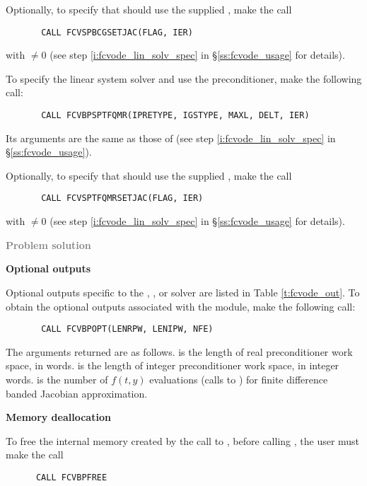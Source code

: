 \begin{Steps}
  Optionally, to specify that {\spbcg} should use the supplied , 
  make the call
\begin{verbatim}
       CALL FCVSPBCGSETJAC(FLAG, IER)
\end{verbatim}
  with  $\neq 0$ 
  (see step \ref{i:fcvode_lin_solv_spec} in \S\ref{ss:fcvode_usage} for details).


  To specify the {\spbcg} linear system solver and use the {\cvbandpre}
  preconditioner, make the following call:
\begin{verbatim}
       CALL FCVBPSPTFQMR(IPRETYPE, IGSTYPE, MAXL, DELT, IER)
\end{verbatim}
  Its arguments are the same as those of 
  (see step \ref{i:fcvode_lin_solv_spec} in \S\ref{ss:fcvode_usage}).
  
  Optionally, to specify that {\sptfqmr} should use the supplied , 
  make the call
\begin{verbatim}
       CALL FCVSPTFQMRSETJAC(FLAG, IER)
\end{verbatim}
  with  $\neq 0$ 
  (see step \ref{i:fcvode_lin_solv_spec} in \S\ref{ss:fcvode_usage} for details).


\item \textcolor{gray}{\bf Problem solution}
  
\item {\bf {\cvbbdpre} Optional outputs}
  
  Optional outputs specific to the {\spgmr}, {\spbcg}, or {\sptfqmr} solver are 
  listed in Table \ref{t:fcvode_out}.
  To obtain the optional outputs associated with the {\cvbandpre} module, make
  the following call:
\begin{verbatim}
       CALL FCVBPOPT(LENRPW, LENIPW, NFE)
\end{verbatim}
  The arguments returned are as follows.
   is the length of real preconditioner work space, in 
  words.  is the length of integer preconditioner work space, in
  integer words.  is the number of $f(t,y)$ evaluations (calls to
  ) for finite difference banded Jacobian approximation.
  
\item {\bf Memory deallocation}

  To free the internal memory created by the call to , before
  calling , the user must make the call
\begin{verbatim}
      CALL FCVBPFREE
\end{verbatim}

\end{Steps}

